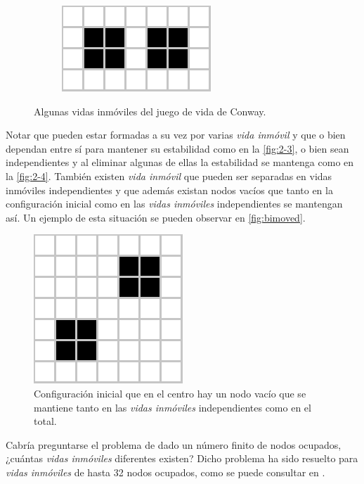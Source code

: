 \documentclass[../proyecto.tex]{memoir}
\begin{document}
\begin{figure}[H]
\begin{subfigure}[b]{0.3\linewidth}
        \caption{}
        \label{fig:2-3}
    \end{subfigure}
    \quad
	\begin{subfigure}[b]{0.3\linewidth} 
        \centering
        \includegraphics[height=.35\linewidth]{./images/biblock.png}
        \caption{}
        \label{fig:2-4}
    \end{subfigure}
	\caption{Algunas vidas inmóviles del juego de vida de Conway.}
	\label{fig:inmoviles}
\end{figure} 


Notar que pueden estar formadas a su vez por varias \textit{vida inmóvil} y que o bien dependan entre sí para mantener su estabilidad como en la \autoref{fig:2-3}, o bien sean independientes y al eliminar algunas de ellas la estabilidad se mantenga como en la \autoref{fig:2-4}. También existen \textit{vida inmóvil} que pueden ser separadas en vidas inmóviles independientes y que además existan nodos vacíos que tanto en la configuración inicial como en las \textit{vidas inmóviles} independientes se mantengan así. Un ejemplo de esta situación se pueden observar en \autoref{fig:bimoved}.

\begin{figure}[H]
	\centering
	\includegraphics[height=.2\linewidth]{./images/bimoved.png}
	\caption{Configuración inicial que en el centro hay un nodo vacío que se mantiene tanto en las \textit{vidas inmóviles} independientes como en el total.}
	\label{fig:bimoved}
\end{figure} 

Cabría preguntarse el problema de dado un número finito de nodos ocupados, ¿cuántas \textit{vidas inmóviles} diferentes existen? Dicho problema ha sido resuelto para \textit{vidas inmóviles} de hasta 32 nodos ocupados, como se puede consultar en \cite{countStillLifes}.
\end{document}
